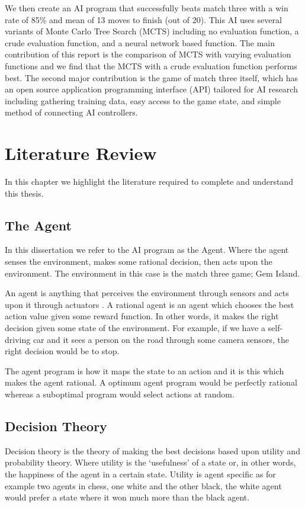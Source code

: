\documentclass{bhamthesis}
\theoremstyle{definition}
\begin{document}
We then create an AI program that successfully beats match three with a win rate of 85\% and mean of 13 moves to finish (out of 20). This AI uses several variants of Monte Carlo Tree Search (MCTS) including no evaluation function, a crude evaluation function, and a neural network based function. The main contribution of this report is the comparison of MCTS with varying evaluation functions and we find that the MCTS with a crude evaluation function performs best. The second major contribution is the game of match three itself, which has an open source application programming interface (API) tailored for AI research including gathering training data, easy access to the game state, and simple method of connecting AI controllers.

\chapter{Literature Review}
In this chapter we highlight the literature required to complete and understand this thesis.
\section{The Agent}
In this dissertation we refer to the AI program as the Agent. Where the agent senses the environment, makes some rational decision, then acts upon the environment. The environment in this case is the match three game; Gem Island.

An agent is anything that perceives the environment through sensors and acts upon it through actuators \cite{Russell2016}. A rational agent is an agent which chooses the best action value given some reward function. In other words, it makes the right decision given some state of the environment. For example, if we have a self-driving car and it sees a person on the road through some camera sensors, the right decision would be to stop.

The agent program is how it maps the state to an action and it is this which makes the agent rational. A optimum agent program would be perfectly rational whereas a suboptimal program would select actions at random.

\section{Decision Theory}
Decision theory is the theory of making the best decisions based upon utility and probability theory. Where utility is the `usefulness' of a state or, in other words, the happiness of the agent in a certain state. Utility is agent specific as for example two agents in chess, one white and the other black, the white agent would prefer a state where it won much more than the black agent. 
\end{document}
